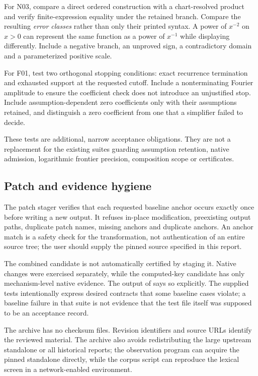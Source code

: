 \documentclass[11pt,a4paper]{article}
\newcommand{\code}[1]{\texttt{\detokenize{#1}}}
\begin{document}
For N03, compare a direct ordered construction with a chart-resolved product and verify finite-expression equality under the retained branch. Compare the resulting \emph{error classes} rather than only their printed syntax. A power of $x^{-2}$ on $x>0$ can represent the same function as a power of $x^{-1}$ while displaying differently. Include a negative branch, an unproved sign, a contradictory domain and a parameterized positive scale.

For F01, test two orthogonal stopping conditions: exact recurrence termination and exhausted support at the requested cutoff. Include a nonterminating Fourier amplitude to ensure the coefficient check does not introduce an unjustified stop. Include assumption-dependent zero coefficients only with their assumptions retained, and distinguish a zero coefficient from one that a simplifier failed to decide.

These tests are additional, narrow acceptance obligations. They are not a replacement for the existing suites guarding assumption retention, native admission, logarithmic frontier precision, composition scope or certificates.

\subsection{Patch and evidence hygiene}
The patch stager verifies that each requested baseline anchor occurs exactly once before writing a new output. It refuses in-place modification, preexisting output paths, duplicate patch names, missing anchors and duplicate anchors. An anchor match is a safety check for the transformation, not authentication of an entire source tree; the user should supply the pinned source specified in this report.

The combined candidate is not automatically certified by staging it. Native changes were exercised separately, while the computed-key candidate has only mechanism-level native evidence. The output of \code{stage_patches.py} says so explicitly. The supplied tests intentionally express desired contracts that some baseline cases violate; a baseline failure in that suite is not evidence that the test file itself was supposed to be an acceptance record.

The archive has no checksum files. Revision identifiers and source URLs identify the reviewed material. The archive also avoids redistributing the large upstream standalone or all historical reports; the observation program can acquire the pinned standalone directly, while the corpus script can reproduce the lexical screen in a network-enabled environment.
\end{document}
